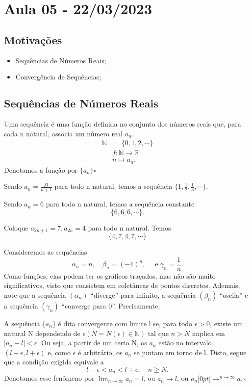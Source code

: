 \documentclass[Analysis/analysis_notes.tex]{subfiles}
\begin{document}
\section{Aula 05 - 22/03/2023}
\subsection{Motiva\c c\~oes}
\begin{itemize}
	\item Sequ\^encias de N\'umeros Reais;
	\item Converg\^encia de Sequ\^encias;
\end{itemize}
\subsection{Sequ\^encias de N\'umeros Reais}
\begin{def*}
	Uma sequ\^encia \'e uma fun\c c\~ao definida no conjunto dos n\'umeros reais que, para cada n natural, associa um n\'umero real $a_{n}$.
	\begin{align*}
		\mathbb{N} & =\{0, 1, 2, \cdots\}               \\
		           & f:\mathbb{N}\rightarrow \mathbb{R} \\
		           & n\mapsto a_{n}.
	\end{align*}
	Denotamos a fun\c c\~ao por $\{a_{n}\}\square$
\end{def*}
\begin{example}
	Sendo $a_{n}=\frac{f1}{n+1}$ para todo n natural, temos a sequ\^encia $\{1, \frac{1}{2}, \frac{1}{3}, \cdots\}$.
\end{example}
\begin{example}
	Sendo $a_{n} = 6$ para todo n natural, temos a sequ\^encia constante
	$$
		\{6, 6, 6,\cdots\}.
	$$
\end{example}
\begin{example}
	Coloque $a_{2n+1} = 7, a_{2n}=4$ para todo n natural. Temos
	$$
		\{4, 7, 4, 7, \cdots\}
	$$
\end{example}
Consideremos as sequ\^encias
$$
	\alpha_{n} = n, \quad \beta_{n} = (-1)^{n},\quad \text{ e } \gamma_{n} = \frac{1}{n}.
$$
Como fun\c c\~oes, elas podem ter os gr\'aficos tra\c cados, mas n\~ao s\~ao muito significativos, visto que consistem em
colet\^aneas de pontos discretos. Ademais, note que a sequ\^encia $(\alpha_{n})$ ``diverge'' para infinito, a sequ\^encia
$(\beta_{n})$ ``oscila'' e a sequ\^encia $(\gamma_{n})$ ``converge para 0''. Precisamente,
\begin{def*}
	A sequ\^encia $\{a_{n}\}$ \'e dita convergente com limite l se, para todo $\epsilon > 0$, existe um natural
	N dependendo de $\epsilon (N = N(\epsilon)\in \mathbb{N})$ tal que $n > N$ implica em $|a_{n} - l|< \epsilon.$
	Ou seja, a partir de um certo N, os $a_{n}$ est\~ao no intervalo $(l-\epsilon, l+\epsilon)$ e, como $\epsilon$
	\'e arbitr\'ario, os $a_{n}$ se juntam em torno de l. Disto, segue que a condi\c c\~ao exigida equivale a
	$$
		l - \epsilon < a_{n} < l + \epsilon, \quad n\geq{N}.
	$$
	Denotamos esse fen\^omeno por $\displaystyle\lim_{n\to\infty}a_{n} = l$, ou $a_{n}\rightarrow l$, ou $a_{n}\overbracket[0pt]{\longrightarrow}^{n\to \infty}a.\square$.
\end{def*}
\end{document}
